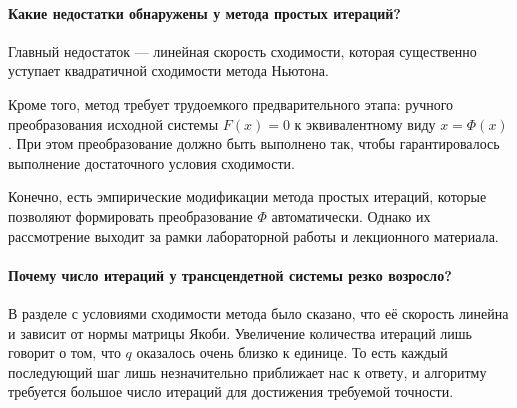 \paragraph{Какие недостатки обнаружены у метода простых итераций?} 
Главный недостаток --- линейная скорость сходимости, которая существенно уступает квадратичной сходимости метода Ньютона.

Кроме того, метод требует трудоемкого предварительного этапа: ручного преобразования исходной системы $F(x) = 0$ к эквивалентному виду $x = \Phi(x)$. При этом преобразование должно быть выполнено так, чтобы гарантировалось выполнение достаточного условия сходимости.

Конечно, есть эмпирические модификации метода простых итераций, которые позволяют формировать преобразование \( \Phi \) автоматически. Однако их рассмотрение выходит за рамки лабораторной работы и лекционного материала.

\paragraph{Почему число итераций у трансцендетной системы резко возросло?} 

В разделе с условиями сходимости метода было сказано, что её скорость линейна и зависит от нормы матрицы Якоби. Увеличение количества итераций лишь говорит о том, что \( q \) оказалось очень близко к единице. То есть каждый последующий шаг лишь незначительно приближает нас к ответу, и алгоритму требуется большое число итераций для достижения требуемой точности.